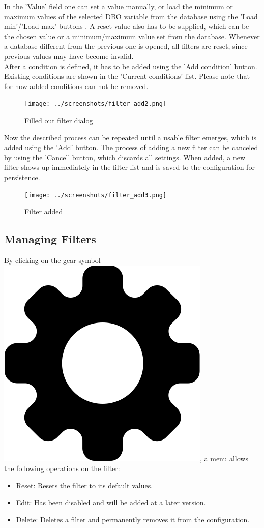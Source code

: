In the 'Value' field one can set a value manually, or load the minimum or maximum values of the selected DBO variable from the database using the 'Load min'/'Load max' buttons . A reset value also has to be supplied, which can be the chosen value or a minimum/maximum value set from the database.  Whenever a database different from the previous one is opened, all filters are reset, since previous values may have become invalid.\\

After a condition is defined, it has to be added using the 'Add condition' button. Existing conditions are shown in the 'Current conditions' list. Please note that for now added conditions can not be removed.

\begin{figure}[H]
  \center
    \texttt{[image: ../screenshots/filter\_add2.png]}
  \caption{Filled out filter dialog}
  \label{fig:filter_add2}
\end{figure}

Now the described process can be repeated until a usable filter emerges, which is added using the 'Add'
button. The process of adding a new filter can be canceled by using the 'Cancel' button, which discards all
settings. When added, a new filter shows up immediately in the filter list and is saved to the configuration
for persistence.

\begin{figure}[H]
  \center
    \texttt{[image: ../screenshots/filter\_add3.png]}
  \caption{Filter added}
  \label{fig:filter_add3}
\end{figure}

\subsection{Managing Filters}
\label{sec:filter_management}

By clicking on the gear symbol \includegraphics[scale=0.025]{../../data/icons/edit.png}, a menu allows the following operations on the filter:

\begin{itemize}  
\item Reset: Resets the filter to its default values.
\item Edit: Has been disabled and will be added at a later version.
\item Delete: Deletes a filter and permanently removes it from the configuration.
\end{itemize}
 
